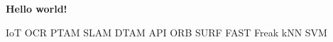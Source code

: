 \documentclass[../main]{subfiles}
\begin{document}
\textbf{Hello world!}

IoT
OCR
PTAM
SLAM
DTAM
API
ORB
SURF
FAST
Freak
kNN
SVM
\end{document}
